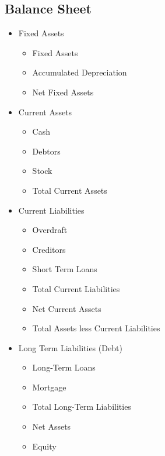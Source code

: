 \documentclass{standalone}
\begin{document}
\subsection{Balance Sheet}
\begin{itemize}
    \item Fixed Assets
        \begin{itemize}
            \item Fixed Assets
            \item Accumulated Depreciation
            \item Net Fixed Assets
        \end{itemize}
    \item Current Assets
        \begin{itemize}
            \item Cash
            \item Debtors
            \item Stock
            \item Total Current Assets
        \end{itemize}
    \item Current Liabilities
        \begin{itemize}
            \item Overdraft
            \item Creditors
            \item Short Term Loans
            \item Total Current Liabilities
            \item Net Current Assets
            \item Total Assets less Current Liabilities
        \end{itemize}
    \item Long Term Liabilities (Debt)
        \begin{itemize}
            \item Long-Term Loans
            \item Mortgage
            \item Total Long-Term Liabilities
            \item Net Assets
            \item Equity
        \end{itemize}
\end{itemize}
\end{document}
